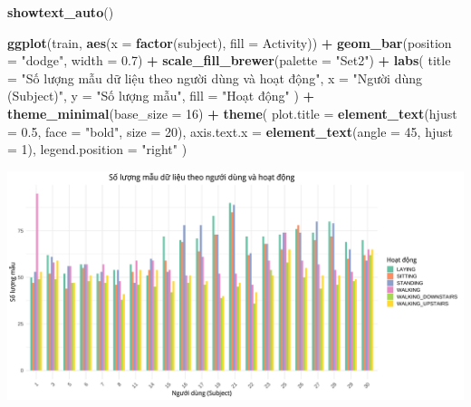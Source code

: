 \documentclass[
]{article}
\newenvironment{Shaded}{\begin{snugshade}}{\end{snugshade}}
\newcommand{\AttributeTok}[1]{\textcolor[rgb]{0.13,0.29,0.53}{#1}}
\newcommand{\DecValTok}[1]{\textcolor[rgb]{0.00,0.00,0.81}{#1}}
\newcommand{\FloatTok}[1]{\textcolor[rgb]{0.00,0.00,0.81}{#1}}
\newcommand{\FunctionTok}[1]{\textcolor[rgb]{0.13,0.29,0.53}{\textbf{#1}}}
\newcommand{\NormalTok}[1]{#1}
\newcommand{\SpecialCharTok}[1]{\textcolor[rgb]{0.81,0.36,0.00}{\textbf{#1}}}
\newcommand{\StringTok}[1]{\textcolor[rgb]{0.31,0.60,0.02}{#1}}
\begin{document}
\begin{Shaded}
\begin{Highlighting}[]
\FunctionTok{showtext\_auto}\NormalTok{()}

\FunctionTok{ggplot}\NormalTok{(train, }\FunctionTok{aes}\NormalTok{(}\AttributeTok{x =} \FunctionTok{factor}\NormalTok{(subject), }\AttributeTok{fill =}\NormalTok{ Activity)) }\SpecialCharTok{+}
  \FunctionTok{geom\_bar}\NormalTok{(}\AttributeTok{position =} \StringTok{"dodge"}\NormalTok{, }\AttributeTok{width =} \FloatTok{0.7}\NormalTok{) }\SpecialCharTok{+}
  \FunctionTok{scale\_fill\_brewer}\NormalTok{(}\AttributeTok{palette =} \StringTok{"Set2"}\NormalTok{) }\SpecialCharTok{+} 
  \FunctionTok{labs}\NormalTok{(}
    \AttributeTok{title =} \StringTok{"Số lượng mẫu dữ liệu theo người dùng và hoạt động"}\NormalTok{,}
    \AttributeTok{x =} \StringTok{"Người dùng (Subject)"}\NormalTok{,}
    \AttributeTok{y =} \StringTok{"Số lượng mẫu"}\NormalTok{,}
    \AttributeTok{fill =} \StringTok{"Hoạt động"}
\NormalTok{  ) }\SpecialCharTok{+}
  \FunctionTok{theme\_minimal}\NormalTok{(}\AttributeTok{base\_size =} \DecValTok{16}\NormalTok{) }\SpecialCharTok{+}
  \FunctionTok{theme}\NormalTok{(}
    \AttributeTok{plot.title =} \FunctionTok{element\_text}\NormalTok{(}\AttributeTok{hjust =} \FloatTok{0.5}\NormalTok{, }\AttributeTok{face =} \StringTok{"bold"}\NormalTok{, }\AttributeTok{size =} \DecValTok{20}\NormalTok{),}
    \AttributeTok{axis.text.x =} \FunctionTok{element\_text}\NormalTok{(}\AttributeTok{angle =} \DecValTok{45}\NormalTok{, }\AttributeTok{hjust =} \DecValTok{1}\NormalTok{),}
    \AttributeTok{legend.position =} \StringTok{"right"}
\NormalTok{  )}
\end{Highlighting}
\end{Shaded}

\includegraphics{report_files/figure-latex/unnamed-chunk-10-1.pdf}
\end{document}
